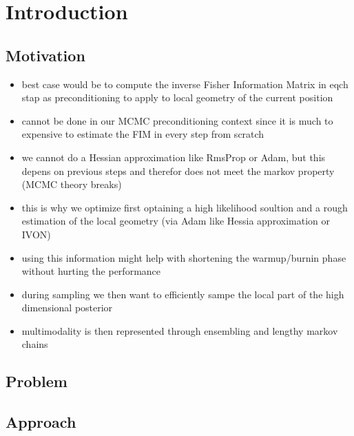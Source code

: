 \chapter{Introduction}\label{chap:introduction}

\section{Motivation}

\begin{itemize}
    \item best case would be to compute the inverse Fisher Information Matrix in eqch stap as preconditioning to apply to local geometry of the current position
    \item cannot be done in our \acrshort{MCMC} preconditioning context since it is much to expensive to estimate the FIM in every step from scratch
    \item we cannot do a Hessian approximation like RmsProp or Adam, but this depens on previous steps and therefor does not meet the markov property (MCMC theory breaks)
    \item this is why we optimize first optaining a high likelihood soultion and a rough estimation of the local geometry (via Adam like Hessia approximation or IVON)
    \item using this information might help with shortening the warmup/burnin phase without hurting the performance
    \item during sampling we then want to efficiently sampe the local part of the high dimensional posterior
    \item multimodality is then represented through ensembling and lengthy markov chains
\end{itemize}


\section{Problem}


\section{Approach}



